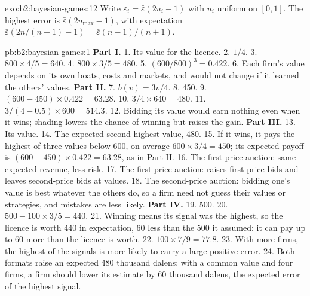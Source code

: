 \begin{solution}{exo:b2:bayesian-games:12}
Write $\varepsilon_i = \bar\varepsilon(2u_i - 1)$ with $u_i$ uniform on $[0, 1]$. The highest error is $\bar\varepsilon(2u_{\max} - 1)$, with expectation $\bar\varepsilon(2n/(n + 1) - 1) =
\bar\varepsilon(n - 1)/(n + 1)$.
\end{solution}

\begin{solution}{pb:b2:bayesian-games:1}
\textbf{Part I.}
1. Its value for the licence.
2. $1/4$.
3. $800 \times 4/5 = 640$.
4. $800 \times 3/5 = 480$.
5. $(600/800)^3 = 0.422$.
6. Each firm's value depends on its own boats, costs and markets, and would not change if it learned the others' values.
\textbf{Part II.}
7. $b(v) = 3v/4$.
8. 450.
9. $(600 - 450) \times 0.422 = 63.28$.
10. $3/4 \times 640 = 480$.
11. $3/(4 - 0.5) \times 600 = 514.3$.
12. Bidding its value would earn nothing even when it wins; shading lowers the chance of winning but raises the gain.
\textbf{Part III.}
13. Its value.
14. The expected second-highest value, 480.
15. If it wins, it pays the highest of three values below 600, on average $600 \times 3/4 = 450$; its expected payoff is $(600 - 450) \times
0.422 = 63.28$, as in Part II.
16. The first-price auction: same expected revenue, less risk.
17. The first-price auction:  raises first-price bids and leaves second-price bids at values.
18. The second-price auction: bidding one's value is best whatever the others do, so a firm need not guess their values
or strategies, and mistakes are less likely.
\textbf{Part IV.}
19. 500.
20. $500 - 100 \times 3/5 = 440$.
21. Winning means its signal was the highest, so the licence is worth 440 in expectation, 60 less than the 500 it assumed:
it can pay up to 60 more than the licence is worth.
22. $100 \times 7/9 = 77.8$.
23. With more firms, the highest of the signals is more likely to carry a large positive error.
24. Both formats raise an expected 480 thousand dalens; with a common value and four firms, a firm should lower its estimate
by 60 thousand dalens, the expected error of the highest signal.
\end{solution}
